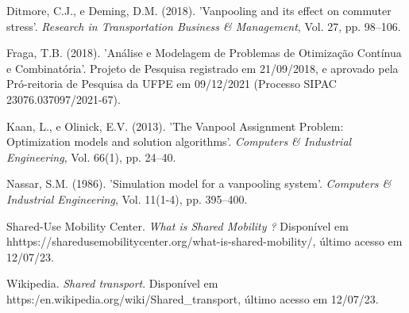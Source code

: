 \documentclass[11pt,a4paper]{article}
\begin{document}
%
%

\clearpage
\begin{thebibliography}{12}

Ditmore, C.J., e Deming, D.M. (2018). 'Vanpooling and its effect on commuter stress'. {\it Research in Transportation Business \& Management}, Vol. 27, pp. 98--106.

Fraga, T.B. (2018). 'Análise e Modelagem de Problemas de Otimização Contínua e Combinatória'. Projeto de Pesquisa registrado em 21/09/2018, e aprovado pela Pró-reitoria de Pesquisa da UFPE em 09/12/2021 (Processo SIPAC 23076.037097/2021-67).

Kaan, L., e Olinick, E.V. (2013). 'The Vanpool Assignment Problem: Optimization models and solution algorithms'. {\it Computers \& Industrial Engineering}, Vol. 66(1), pp. 24--40.

Nassar, S.M. (1986). 'Simulation model for a vanpooling system'. {\it Computers \& Industrial Engineering}, Vol. 11(1-4), pp. 395--400.

Shared-Use Mobility Center. {\it What is Shared Mobility ?} Disponível em hhttps://sharedusemobilitycenter.org/what-is-shared-mobility/, último acesso em 12/07/23.

Wikipedia. {\it Shared transport}. Disponível em https:/en.wikipedia.org/wiki/Shared\_transport, último acesso em 12/07/23.


\end{thebibliography} 
\end{document}
